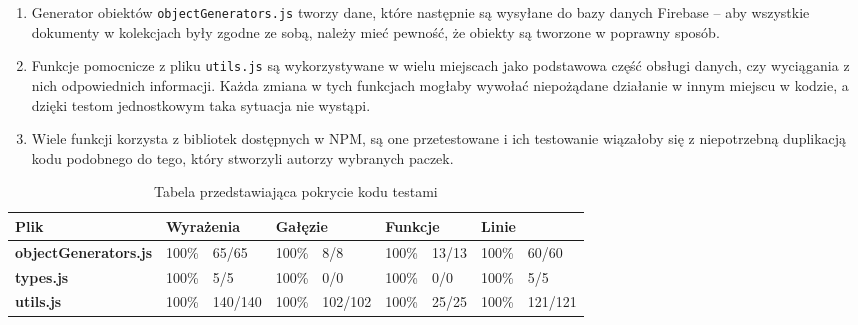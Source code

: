 \documentclass[shortabstract]{iithesis}
\theoremstyle{definition} \newtheorem{definition}{Definicja}[]
\theoremstyle{remark} \newtheorem{remark}[definition]{Observation}
\theoremstyle{plain} \newtheorem{theorem}[definition]{Theorem}
\theoremstyle{plain} \newtheorem{lemma}[definition]{Lemma}
\begin{document}
\begin{enumerate}
    \item Generator obiektów \texttt{objectGenerators.js} tworzy dane, które następnie są wysyłane do bazy danych Firebase -- aby wszystkie dokumenty w kolekcjach były zgodne ze sobą, należy mieć pewność, że obiekty są tworzone w poprawny sposób.
    \item Funkcje pomocnicze z pliku \texttt{utils.js} są wykorzystywane w wielu miejscach jako podstawowa część obsługi danych, czy wyciągania z nich odpowiednich informacji. Każda zmiana w tych funkcjach mogłaby wywołać niepożądane działanie w innym miejscu w kodzie, a dzięki testom jednostkowym taka sytuacja nie wystąpi.
    \item Wiele funkcji korzysta z bibliotek dostępnych w NPM, są one przetestowane i ich testowanie wiązałoby się z niepotrzebną duplikacją kodu podobnego do tego, który stworzyli autorzy wybranych paczek.
\end{enumerate}

\begin{table}[h]
    \begin{tabular}{|l|ll|ll|ll|ll|}
    \hline
    \textbf{Plik}                & \multicolumn{2}{l|}{\textbf{Wyrażenia}} & \multicolumn{2}{l|}{\textbf{Gałęzie}} & \multicolumn{2}{l|}{\textbf{Funkcje}} & \multicolumn{2}{l|}{\textbf{Linie}}  \\ \hline
    \textbf{objectGenerators.js} & \multicolumn{1}{l|}{100\%}   & 65/65    & \multicolumn{1}{l|}{100\%}  & 8/8     & \multicolumn{1}{l|}{100\%}   & 13/13  & \multicolumn{1}{l|}{100\%} & 60/60   \\ \hline
    \textbf{types.js}            & \multicolumn{1}{l|}{100\%}   & 5/5      & \multicolumn{1}{l|}{100\%}  & 0/0     & \multicolumn{1}{l|}{100\%}   & 0/0    & \multicolumn{1}{l|}{100\%} & 5/5     \\ \hline
    \textbf{utils.js}            & \multicolumn{1}{l|}{100\%}   & 140/140  & \multicolumn{1}{l|}{100\%}  & 102/102 & \multicolumn{1}{l|}{100\%}   & 25/25  & \multicolumn{1}{l|}{100\%} & 121/121 \\ \hline
    \end{tabular}
    \caption{\label{tab:tests-coverage}Tabela przedstawiająca pokrycie kodu testami}
\end{table}
\end{document}
